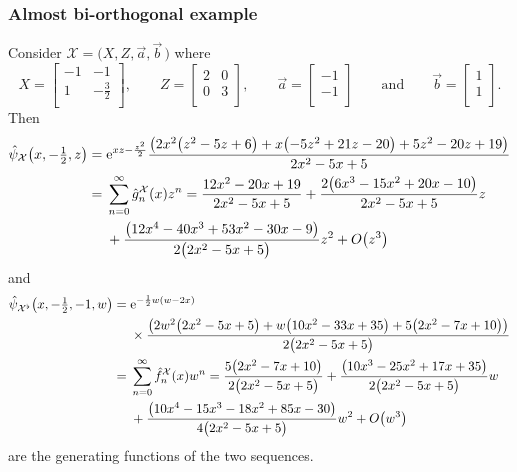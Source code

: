 \documentclass[pdftex]{sigma}
\numberwithin{equation}{section}
\theoremstyle{definition}
\def\X{\mathcal{X}}
\def\ff{\hat f}
\def\gg{\hat g}
\begin{document}
\subsubsection{Almost bi-orthogonal example}
Consider
$
\X=\bigl(X,Z,\vec a,\vec b\,\bigr)$ where
\[
X=\left[
\begin{matrix}
 -1 & -1 \\
 1 & -\frac{3}{2} \\
\end{matrix}
\right]
,\qquad Z=\left[
\begin{matrix}
 2 & 0 \\
 0 & 3 \\
\end{matrix}
\right]
,\qquad \vec a=\left[
\begin{matrix}
 -1 \\
 -1 \\
\end{matrix}
\right]\qquad\text{and}\qquad
\vec b=\left[
\begin{matrix}
 1 \\
 1 \\
\end{matrix}
\right].
\]
Then
\begin{align*}
\hat\psi_{\X}\bigl(x,-\tfrac{1}{2},z\bigr)={}&{\rm e}^{x z-\frac{z^2}{2}}\frac{
 \bigl(2 x^2 \bigl(z^2-5
 z+6\bigr)+x \bigl(-5 z^2+21
 z-20\bigr)+5 z^2-20
 z+19\bigr)}{2 x^2-5 x+5}\\
 ={}&\sum_{n=0}^{\infty} \gg_n^{\X}(x)z^n
 =\frac{12 x^2-20 x+19}{2 x^2-5
 x+5}+\frac{2 \bigl(6 x^3-15
 x^2+20 x-10\bigr) }{2 x^2-5
 x+5}z\\
 &+\frac{\bigl(12 x^4-40
 x^3+53 x^2-30 x-9\bigr)
 }{2 \bigl(2 x^2-5
 x+5\bigr)}z^2+O\bigl(z^3\bigr)
\end{align*}
 and
\begin{align*}
 \hat \psi_{\X^\flat}\bigl(x,-\tfrac{1}{2},-1,w\bigr)
={}&
{\rm e}^{-\frac{1}{2} w (w-2 x)}\\
&\times\frac{
 \bigl(2 w^2 \bigl(2 x^2-5
 x+5\bigr)+w \bigl(10 x^2-33
 x+35\bigr)+5 \bigl(2 x^2-7
 x+10\bigr)\bigr)}{2 \bigl(2
 x^2-5 x+5\bigr)}\\
 ={}&\sum_{n=0}^{\infty} \ff_n^{\X}(x)w^n
 =\frac{5 \bigl(2 x^2-7
 x+10\bigr)}{2 \bigl(2 x^2-5
 x+5\bigr)}+\frac{ \bigl(10
 x^3-25 x^2+17 x+35\bigr)}{2
 \bigl(2 x^2-5
 x+5\bigr)}w \\
 &
 +\frac{ \bigl(10
 x^4-15 x^3-18 x^2+85
 x-30\bigr)}{4 \bigl(2 x^2-5
 x+5\bigr)}w^2+O\bigl(w^3\bigr)
\end{align*}
are the generating functions of the two sequences.
\end{document}
